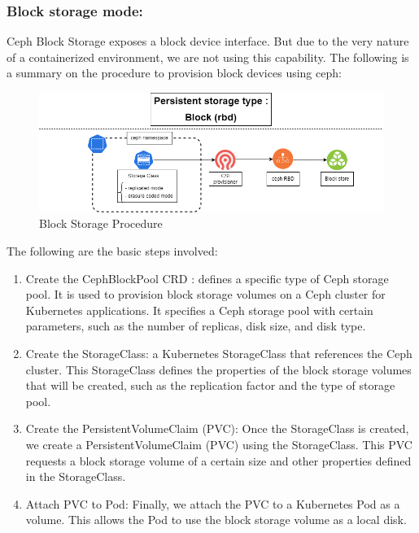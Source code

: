 \subsubsection{Block storage mode: }

Ceph Block Storage exposes a block device interface. But due to the very nature of a containerized environment, we are not using this capability. The following is a summary on the procedure to provision block devices using ceph: 

\begin{figure}[H]\centering
\includegraphics[width=1.0\textwidth,angle=00]{assets/f33.png}
\caption{Block Storage Procedure}
\label{fig:Block Storage Procedure}
\end{figure}

The following are the basic steps involved: 

\begin{enumerate}[label = (\arabic*)]
\item Create the CephBlockPool CRD : defines a specific type of Ceph storage pool. It is used to provision block storage volumes on a Ceph cluster for Kubernetes applications. It specifies a Ceph storage pool with certain parameters, such as the number of replicas, disk size, and disk type. 
\item Create the StorageClass: a Kubernetes StorageClass that references the Ceph cluster. This StorageClass defines the properties of the block storage volumes that will be created, such as the replication factor and the type of storage pool. 
\item Create the PersistentVolumeClaim (PVC): Once the StorageClass is created, we create a PersistentVolumeClaim (PVC) using the StorageClass. This PVC requests a block storage volume of a certain size and other properties defined in the StorageClass. 
\item Attach PVC to Pod: Finally, we attach the PVC to a Kubernetes Pod as a volume. This allows the Pod to use the block storage volume as a local disk. 
\end{enumerate}

